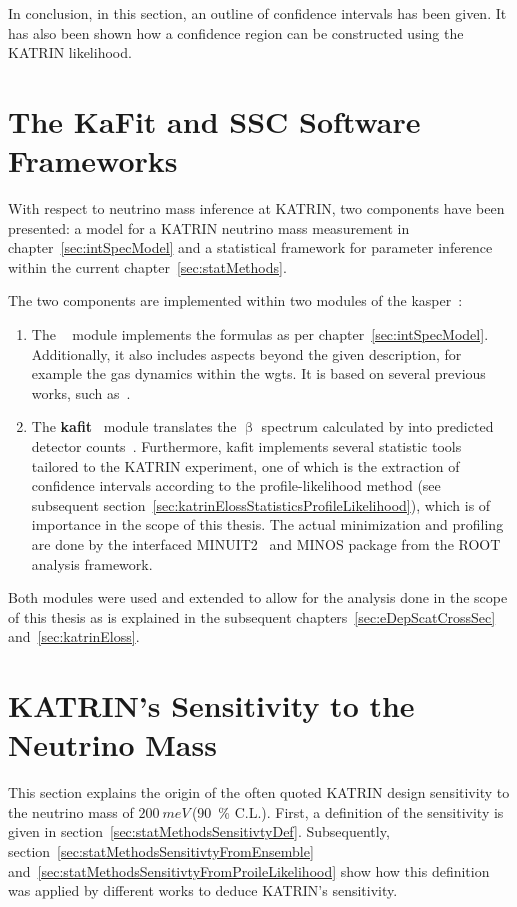 In conclusion, in this section, an outline of confidence intervals has been given. It has also been shown how a confidence region can be constructed using the KATRIN likelihood. 

\section{The KaFit and SSC Software Frameworks}
\label{sec:statMethodsKaFitSSC}
With respect to neutrino mass inference at KATRIN, two components have been presented: a model for a KATRIN neutrino mass measurement in chapter~\ref{sec:intSpecModel} and a statistical framework for parameter inference within the current chapter~\ref{sec:statMethods}.

The two components are implemented within two modules of the \gls{kasper}~\cite{Kasper}:\mynobreakpar
\begin{enumerate}
	\item The \textbf{}~\cite{SSC} module implements the formulas as per chapter~\ref{sec:intSpecModel}. Additionally, it also includes aspects beyond the given description, for example the gas dynamics within the \gls{wgts}. It is based on several previous works, such as~\cite{Hoetzel2012, Groh2015, Kleesiek2014, Kaefer2012, Heizmann2018, Kuckert2016}.
	\item The \textbf{\gls{kafit}}~\cite{KaFit} module translates the $\upbeta$ spectrum calculated by  into predicted detector counts~\cite{Kleesiek2014}. Furthermore, \gls{kafit} implements several statistic tools tailored to the KATRIN experiment, one of which is the extraction of confidence intervals according to the profile-likelihood method (see subsequent section~\ref{sec:katrinElossStatisticsProfileLikelihood}), which is of importance in the scope of this thesis. The actual minimization and profiling are done by the interfaced MINUIT2~\cite{James1998} and MINOS package from the ROOT~\cite{ANTCHEVA2009} analysis framework.
\end{enumerate}

Both modules were used and extended to allow for the analysis done in the scope of this thesis as is explained in the subsequent chapters~\ref{sec:eDepScatCrossSec} and~\ref{sec:katrinEloss}.

\section{KATRIN's Sensitivity to the Neutrino Mass}
\label{sec:statMethodsKatrinSensitivity}
This section explains the origin of the often quoted KATRIN design sensitivity to the neutrino mass of $\SI{200}{meV}$\,(\SI{90}{\percent} C.L.). First, a definition of the sensitivity is given in section~\ref{sec:statMethodsSensitivtyDef}. Subsequently, section~\ref{sec:statMethodsSensitivtyFromEnsemble} and~\ref{sec:statMethodsSensitivtyFromProileLikelihood} show how this definition was applied by different works to deduce KATRIN's sensitivity.

